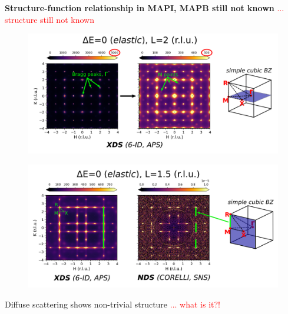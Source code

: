 \documentclass[12pt]{beamer}
\begin{document}
\begin{frame} %

\textbf{Structure-function relationship in MAPI, MAPB still not known}\textcolor{red}{ ... structure still not known}

\vspace{1cm}
\begin{figure}
    \includegraphics[width=1.0\linewidth]{figs/bragg.png}
\end{figure}

\end{frame}


\begin{frame} %

\begin{figure}
    \includegraphics[width=1.0\linewidth]{figs/zb.png}
\end{figure}

\vspace{0.5cm}
Diffuse scattering shows non-trivial structure \textcolor{red}{... what is it?!} 

\end{frame}
\end{document}
